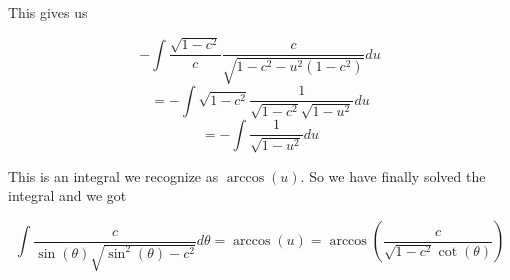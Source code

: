 \documentclass[a4paper,norsk, 10pt]{article}
\begin{document}
This gives us

$$
 -\int \frac{\sqrt{1-c^2}}{c}\frac{c}{\sqrt{1-c^2-u^2(1-c^2)}} du
$$
$$
= -\int {\sqrt{1-c^2}}\frac{1}{\sqrt{1-c^2}\sqrt{1-u^2}} du
$$
$$
= -\int\frac{1}{\sqrt{1-u^2}} du
$$

This is an integral we recognize as $\arccos(u)$. So we have finally solved the integral and we got

\begin{equation}
 \int \frac{c}{\sin(\theta) \sqrt{\sin^2(\theta) - c^2}} d\theta = \arccos(u) = \arccos\left(\frac{c}{\sqrt{1-c^2}\cot(\theta)}\right)
\end{equation}


\label{subsec:integral}


 

\end{document}
